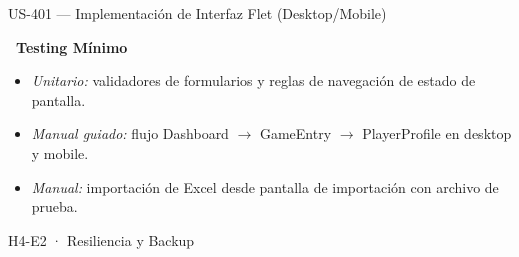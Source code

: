 \documentclass[11pt,a4paper]{article}
\newcommand{\usfield}[2][\;]{%
  \par\vspace{5pt}%
  {\small\textbf{\textcolor{primary}{#2}}}\par\vspace{2pt}%
}
\begin{document}
\begin{uscard}{US-401 — Implementación de Interfaz Flet (Desktop/Mobile)}
\usfield{\faFlask\ Testing Mínimo}
\begin{itemize}[nosep, leftmargin=1.6em]
  \item \textit{Unitario:} validadores de formularios y reglas de navegación de estado de pantalla.
  \item \textit{Manual guiado:} flujo Dashboard $\rightarrow$ GameEntry $\rightarrow$ PlayerProfile en desktop y mobile.
  \item \textit{Manual:} importación de Excel desde pantalla de importación con archivo de prueba.
\end{itemize}

\end{uscard}

\begin{epicbox}{H4-E2 · Resiliencia y Backup}
\end{epicbox}
\end{document}
